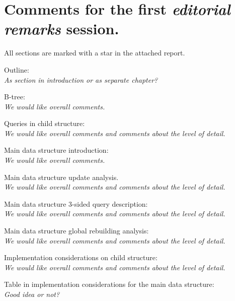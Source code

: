 \documentclass[a4paper,11pt,agenda,chair]{meetingmins}
\begin{document}
\maketitle

\section{Comments for the first \textit{editorial remarks} session.}
\begin{items}
\item All sections are marked with a star in the attached report.
	\begin{items}
		\item Outline: \\ \textit{As section in introduction or as separate chapter?}
		\item B-tree: \\ \textit{We would like overall comments.}
		\item Queries in child structure: \\ \textit{We would like overall comments and comments about the level of detail.}
		\item Main data structure introduction: \\ \textit{We would like overall comments.}
		\item Main data structure update analysis. \\ \textit{We would like overall comments and comments about the level of detail.}
		\item Main data structure 3-sided query description: \\ \textit{We would like overall comments and comments about the level of detail.}
		\item Main data structure global rebuilding analysis: \\ \textit{We would like overall comments and comments about the level of detail.}
		\item Implementation considerations on child structure: \\ \textit{We would like overall comments and comments about the level of detail.}
		\item Table in implementation considerations for the main data structure: \\ \textit{Good idea or not?}
	\end{items}
\end{items}
\end{document}
